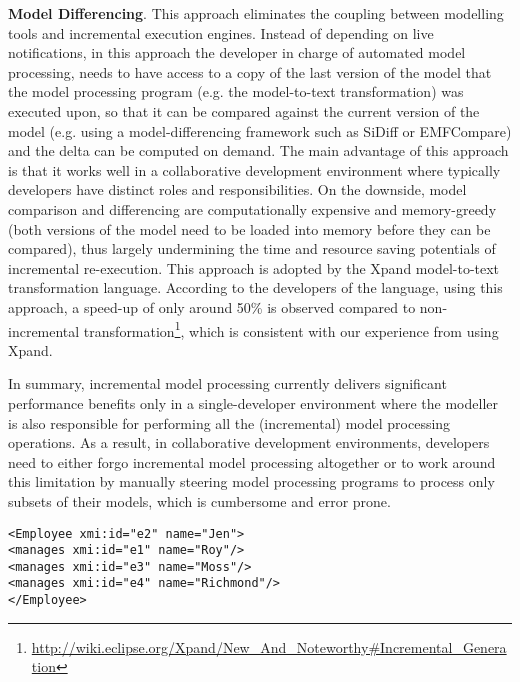 \textbf{Model Differencing}. This approach eliminates the coupling between modelling tools and incremental execution engines. Instead of depending on live notifications, in this approach the developer in charge of automated model processing, needs to have access to a copy of the last version of the model that the model processing program (e.g. the model-to-text transformation) was executed upon, so that it can be compared against the current version of the model (e.g. using a model-differencing framework such as SiDiff or EMFCompare) and the delta can be computed on demand. The main advantage of this approach is that it works well in a collaborative development environment where typically developers have distinct roles and responsibilities. On the downside, model comparison and differencing are computationally expensive and memory-greedy (both versions of the model need to be loaded into memory before they can be compared), thus largely undermining the time and resource saving potentials of incremental re-execution. This approach is adopted by the Xpand model-to-text transformation language. According to the developers of the language, using this approach, a speed-up of only around 50\% is observed compared to non-incremental transformation\footnote{\url{http://wiki.eclipse.org/Xpand/New_And_Noteworthy\#Incremental_Generation}}, which is consistent with our experience from using Xpand.

In summary, incremental model processing currently delivers significant performance benefits only in a single-developer environment where the modeller is also responsible for performing all the (incremental) model processing operations. As a result, in collaborative development environments, developers need to either forgo incremental model processing altogether or to work around this limitation by manually steering model processing programs to process only subsets of their models, which is cumbersome and error prone.

\begin{lstlisting}[style=xmi,caption={State-based representation of the model of Figure \ref{fig:modified_chart} in (simplified) XMI.},label=lst:xmimodel]
<Employee xmi:id="e2" name="Jen">
<manages xmi:id="e1" name="Roy"/>
<manages xmi:id="e3" name="Moss"/>
<manages xmi:id="e4" name="Richmond"/>
</Employee>
\end{lstlisting}


